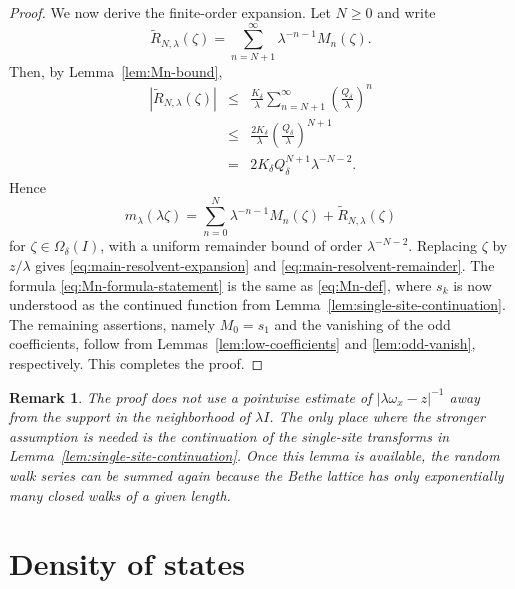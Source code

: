 \documentclass[a4paper,11pt]{article}
\newtheorem{rem}[thm]{Remark}
\begin{document}
\begin{proof}
We now derive the finite-order expansion. 
Let $N\ge0$ and write
\begin{equation}
\label{eq:Rtilde-def}
\widetilde R_{N,\lambda}(\zeta)
=
\sum_{n=N+1}^{\infty}\lambda^{-n-1}M_n(\zeta).
\end{equation}
Then, by Lemma~\ref{lem:Mn-bound},
\begin{eqnarray}
|\widetilde R_{N,\lambda}(\zeta)|
&\le&
\frac{K_\delta}{\lambda}
\sum_{n=N+1}^{\infty}
\left(\frac{Q_\delta}{\lambda}\right)^n
\nonumber\\
&\le&
\frac{2K_\delta}{\lambda}
\left(\frac{Q_\delta}{\lambda}\right)^{N+1}
\nonumber\\
&=&
2K_\delta Q_\delta^{N+1}\lambda^{-N-2}.
\label{eq:Rtilde-bound}
\end{eqnarray}
Hence
\begin{equation}
\label{eq:scaled-main-expansion}
m_\lambda(\lambda\zeta)=\sum_{n=0}^{N}\lambda^{-n-1}M_n(\zeta)+\widetilde R_{N,\lambda}(\zeta)
\end{equation}
for $\zeta\in\Omega_\delta(I)$, with a uniform remainder bound of order $\lambda^{-N-2}$. 
Replacing $\zeta$ by $z/\lambda$ gives \eqref{eq:main-resolvent-expansion} and
\eqref{eq:main-resolvent-remainder}. 
The formula \eqref{eq:Mn-formula-statement} is the same as \eqref{eq:Mn-def}, where
$s_k$ is now understood as the continued function from
Lemma~\ref{lem:single-site-continuation}. 
The remaining assertions, namely $M_0=s_1$ and the vanishing of the odd coefficients, follow from
Lemmas~\ref{lem:low-coefficients} and \ref{lem:odd-vanish}, respectively.
This completes the proof.
\end{proof}

\begin{rem}
The proof does not use a pointwise estimate of
$|\lambda\omega_x-z|^{-1}$ away from the support in the neighborhood of $\lambda I$. 
The only place where the stronger assumption is needed is
the continuation of the single-site transforms in Lemma~\ref{lem:single-site-continuation}.
Once this lemma is available,
the random walk series can be summed again because the Bethe lattice has
only exponentially many closed walks of a given length.
\end{rem}


\section{Density of states}
\end{document}
